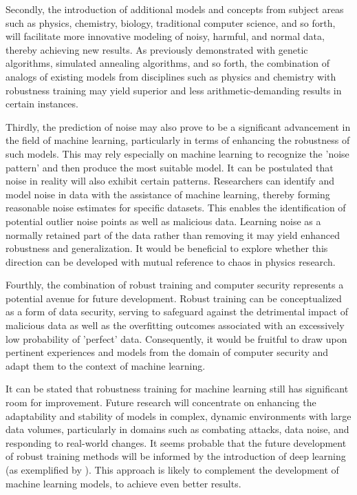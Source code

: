 \documentclass{article}
\begin{document}
Secondly, the introduction of additional models and concepts from subject areas such as physics, chemistry, biology, traditional computer science, and so forth, will facilitate more innovative modeling of noisy, harmful, and normal data, thereby achieving new results. As previously demonstrated with genetic algorithms, simulated annealing algorithms, and so forth, the combination of analogs of existing models from disciplines such as physics and chemistry with robustness training may yield superior and less arithmetic-demanding results in certain instances.

Thirdly, the prediction of noise may also prove to be a significant advancement in the field of machine learning, particularly in terms of enhancing the robustness of such models. This may rely especially on machine learning to recognize the 'noise pattern' and then produce the most suitable model. It can be postulated that noise in reality will also exhibit certain patterns. Researchers can identify and model noise in data with the assistance of machine learning, thereby forming reasonable noise estimates for specific datasets. This enables the identification of potential outlier noise points as well as malicious data. Learning noise as a normally retained part of the data rather than removing it may yield enhanced robustness and generalization. It would be beneficial to explore whether this direction can be developed with mutual reference to chaos in physics research.

Fourthly, the combination of robust training and computer security represents a potential avenue for future development. Robust training can be conceptualized as a form of data security, serving to safeguard against the detrimental impact of malicious data as well as the overfitting outcomes associated with an excessively low probability of 'perfect' data. Consequently, it would be fruitful to draw upon pertinent experiences and models from the domain of computer security and adapt them to the context of machine learning.

It can be stated that robustness training for machine learning still has significant room for improvement. Future research will concentrate on enhancing the adaptability and stability of models in complex, dynamic environments with large data volumes, particularly in domains such as combating attacks, data noise, and responding to real-world changes. It seems probable that the future development of robust training methods will be informed by the introduction of deep learning (as exemplified by  \cite{akhmedova2024ganeticlossgenerativeadversarial}). This approach is likely to complement the development of machine learning models, to achieve even better results.
\end{document}
